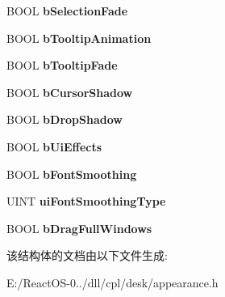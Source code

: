 \begin{DoxyCompactItemize}
\item 
\mbox{\label{struct_e_f_f_e_c_t_s_ab051eba0bf7b339cc94bf116ee7570fe}} 
B\+O\+OL {\bfseries b\+Selection\+Fade}
\item 
\mbox{\label{struct_e_f_f_e_c_t_s_a9d8317cf0c8e80e8405f63d61219f91f}} 
B\+O\+OL {\bfseries b\+Tooltip\+Animation}
\item 
\mbox{\label{struct_e_f_f_e_c_t_s_af14a56c686b80cc48f081b86096a77d5}} 
B\+O\+OL {\bfseries b\+Tooltip\+Fade}
\item 
\mbox{\label{struct_e_f_f_e_c_t_s_a60600fba5ae157e9b684f90539360504}} 
B\+O\+OL {\bfseries b\+Cursor\+Shadow}
\item 
\mbox{\label{struct_e_f_f_e_c_t_s_a03974c4d5a473d281ffedb432b4c0a7c}} 
B\+O\+OL {\bfseries b\+Drop\+Shadow}
\item 
\mbox{\label{struct_e_f_f_e_c_t_s_a29ea340768ced079c7e8441370a2c4ff}} 
B\+O\+OL {\bfseries b\+Ui\+Effects}
\item 
\mbox{\label{struct_e_f_f_e_c_t_s_ad5d7bf3617951ced35589eb3d8ee8cee}} 
B\+O\+OL {\bfseries b\+Font\+Smoothing}
\item 
\mbox{\label{struct_e_f_f_e_c_t_s_a3750df5082bff92bb217352c64553754}} 
U\+I\+NT {\bfseries ui\+Font\+Smoothing\+Type}
\item 
\mbox{\label{struct_e_f_f_e_c_t_s_a663db30cecef000ecb072b9f7229be02}} 
B\+O\+OL {\bfseries b\+Drag\+Full\+Windows}
\end{DoxyCompactItemize}


该结构体的文档由以下文件生成\+:\begin{DoxyCompactItemize}
\item 
E\+:/\+React\+O\+S-\/0../dll/cpl/desk/appearance.\+h\end{DoxyCompactItemize}
